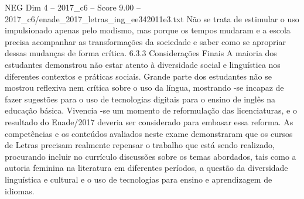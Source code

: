 \begin{textsample}{NEG Dim 4 – 2017\_c6 – Score 9.00 – 2017\_c6/enade\_2017\_letras\_ing\_ee342011e3.txt}
Não se trata de estimular o uso impulsionado apenas pelo modismo, mas porque os tempos mudaram e a escola precisa acompanhar as transformações da sociedade e saber como se apropriar dessas mudanças de forma crítica. 6.3.3 Considerações Finais A maioria dos estudantes demonstrou não estar atento à diversidade social e linguística nos diferentes contextos e práticas sociais.
Grande parte dos estudantes não se mostrou reflexiva nem crítica sobre o uso da língua, mostrando -se incapaz de fazer sugestões para o uso de tecnologias digitais para o ensino de inglês na educação básica.
Vivencia -se um momento de reformulação das licenciaturas, e o resultado do Enade/2017 deveria ser considerado para embasar essa reforma.
As competências e os conteúdos avaliados neste exame demonstraram que os cursos de Letras precisam realmente repensar o trabalho que está sendo realizado, procurando incluir no currículo discussões sobre os temas abordados, tais como a autoria feminina na literatura em diferentes períodos, a questão da diversidade linguística e cultural e o uso de tecnologias para ensino e aprendizagem de idiomas.

\end{textsample}
